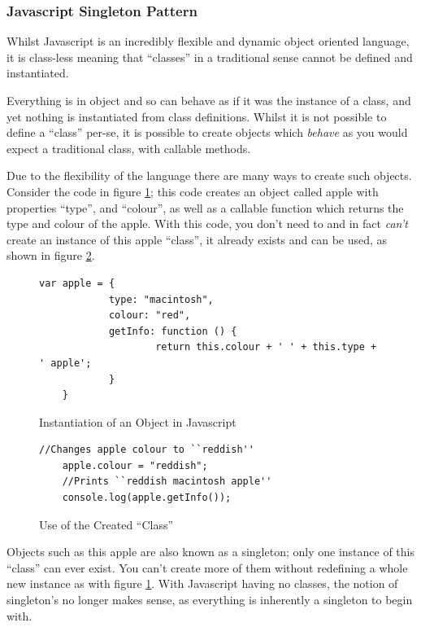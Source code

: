 \subsubsection{Javascript Singleton Pattern}
\label{subsubs:jsSingleton}

\FloatBarrier

Whilst Javascript is an incredibly flexible and dynamic object oriented language, it is class-less meaning that ``classes'' in a traditional sense cannot be defined and instantiated.

Everything is in object and so can behave as if it was the instance of a class, and yet nothing is instantiated from class definitions.  Whilst it is not possible to define a ``class'' per-se, it is possible to create objects which \textit{behave} as you would expect a traditional class, with callable methods\cite{jsClasses}.

Due to the flexibility of the language there are many ways to create such objects.  Consider the code in figure \ref{fig:jsObjectInst};  this code creates an object called apple with properties ``type'', and ``colour'', as well as a callable function which returns the type and colour of the apple.  With this code, you don't need to and in fact \textit{can't} create an instance of this apple ``class'', it already exists and can be used, as shown in figure \ref{fig:usingAppleClass}.

\begin{figure}
\lstset{language=JavaScript}
\begin{lstlisting}[tabsize=2,breaklines=true]
	var apple = {
			type: "macintosh",
			colour: "red",
			getInfo: function () {
					return this.colour + ' ' + this.type + ' apple';
			}
	}
	\end{lstlisting}
	\caption{Instantiation of an Object in Javascript}
	\label{fig:jsObjectInst}
\end{figure}

\begin{figure}
\lstset{language=JavaScript}
\begin{lstlisting}[tabsize=2,breaklines=true]
	//Changes apple colour to ``reddish''
	apple.colour = "reddish";
	//Prints ``reddish macintosh apple''
	console.log(apple.getInfo());
	\end{lstlisting}
	\caption{Use of the Created ``Class''}
	\label{fig:usingAppleClass}
\end{figure}

Objects such as this apple are also known as a singleton; only one instance of this ``class'' can ever exist.  You can't create more of them without redefining a whole new instance as with figure \ref{fig:jsObjectInst}.  With Javascript having no classes, the notion of singleton's no longer makes sense, as everything is inherently a singleton to begin with.

